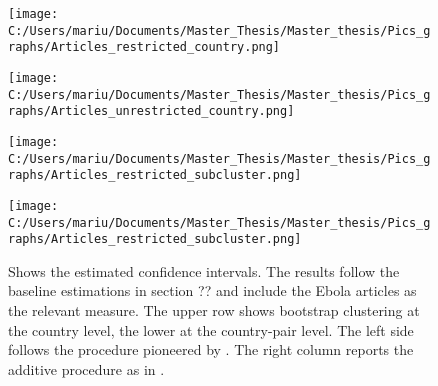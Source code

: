 \documentclass{article}
\begin{document}
\begin{figure}[!ht] 
\begin{minipage}[t]{0.5\linewidth}\vspace{0pt} 
\texttt{[image: C:/Users/mariu/Documents/Master\_Thesis/Master\_thesis/Pics\_graphs/Articles\_restricted\_country.png]}\\
\vspace{2ex}
\end{minipage}\hfill%
\begin{minipage}[t]{0.5\linewidth}\vspace{0pt} 
\texttt{[image: C:/Users/mariu/Documents/Master\_Thesis/Master\_thesis/Pics\_graphs/Articles\_unrestricted\_country.png]}\\
\vspace{2ex}
\end{minipage}\hfill%
\begin{minipage}[t]{0.5\linewidth}\vspace{0pt} 
\texttt{[image: C:/Users/mariu/Documents/Master\_Thesis/Master\_thesis/Pics\_graphs/Articles\_restricted\_subcluster.png]}\\
\vspace{2ex}
\end{minipage}\hfill%
\begin{minipage}[t]{0.5\linewidth}\vspace{0pt} 
\texttt{[image: C:/Users/mariu/Documents/Master\_Thesis/Master\_thesis/Pics\_graphs/Articles\_restricted\_subcluster.png]}\\
\vspace{2ex}
\end{minipage}\hfill%
\caption{Shows the estimated confidence intervals. The results follow the baseline estimations in section ?? and include the Ebola articles as the relevant measure.
The upper row shows bootstrap clustering at the country level, the lower at the country-pair level. The left side follows the procedure pioneered by \cite{cameron2008bootstrap}. The right column reports the additive procedure as in \cite{mackinnon2018wild}.} 
\label{Wild cluster bootstrap I}
\end{figure}
\end{document}
